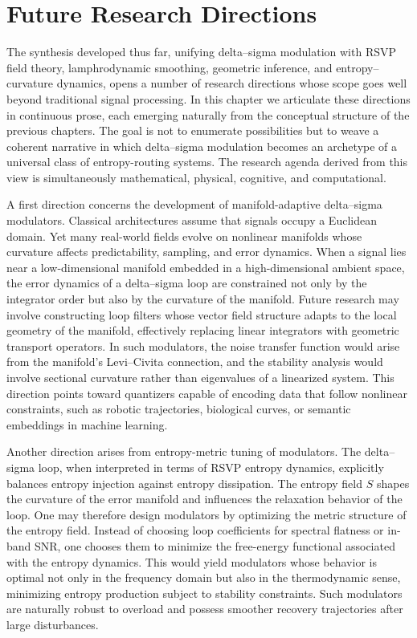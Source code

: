 
\chapter{Future Research Directions}

The synthesis developed thus far, unifying delta–sigma modulation with RSVP field theory, lamphrodynamic smoothing, geometric inference, and entropy–curvature dynamics, opens a number of research directions whose scope goes well beyond traditional signal processing. In this chapter we articulate these directions in continuous prose, each emerging naturally from the conceptual structure of the previous chapters. The goal is not to enumerate possibilities but to weave a coherent narrative in which delta–sigma modulation becomes an archetype of a universal class of entropy-routing systems. The research agenda derived from this view is simultaneously mathematical, physical, cognitive, and computational.

A first direction concerns the development of manifold-adaptive delta–sigma modulators. Classical architectures assume that signals occupy a Euclidean domain. Yet many real-world fields evolve on nonlinear manifolds whose curvature affects predictability, sampling, and error dynamics. When a signal lies near a low-dimensional manifold embedded in a high-dimensional ambient space, the error dynamics of a delta–sigma loop are constrained not only by the integrator order but also by the curvature of the manifold. Future research may involve constructing loop filters whose vector field structure adapts to the local geometry of the manifold, effectively replacing linear integrators with geometric transport operators. In such modulators, the noise transfer function would arise from the manifold’s Levi–Civita connection, and the stability analysis would involve sectional curvature rather than eigenvalues of a linearized system. This direction points toward quantizers capable of encoding data that follow nonlinear constraints, such as robotic trajectories, biological curves, or semantic embeddings in machine learning.

Another direction arises from entropy-metric tuning of modulators. The delta–sigma loop, when interpreted in terms of RSVP entropy dynamics, explicitly balances entropy injection against entropy dissipation. The entropy field \(S\) shapes the curvature of the error manifold and influences the relaxation behavior of the loop. One may therefore design modulators by optimizing the metric structure of the entropy field. Instead of choosing loop coefficients for spectral flatness or in-band SNR, one chooses them to minimize the free-energy functional associated with the entropy dynamics. This would yield modulators whose behavior is optimal not only in the frequency domain but also in the thermodynamic sense, minimizing entropy production subject to stability constraints. Such modulators are naturally robust to overload and possess smoother recovery trajectories after large disturbances.

